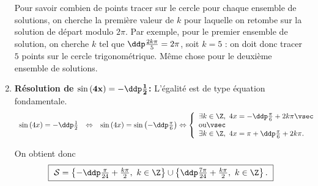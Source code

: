\begin{correction}
\begin{enumerate}
Pour savoir combien de points tracer sur le cercle pour chaque ensemble de solutions, on cherche la premi\`ere valeur de $k$ pour laquelle on retombe sur la solution de d\'epart modulo $2\pi$. Par exemple, pour le premier ensemble de solution, on cherche $k$ tel que $\ddp \frac{2k\pi}{5} = 2\pi$, soit $k=5$ : on doit donc tracer $5$ points sur le cercle trigonom\'etrique. M\^eme chose pour le deuxi\`eme ensemble de solutions.
\item  \textbf{R\'esolution de $\mathbf{\sin{(4x)}=-\ddp\frac{1}{2}}$:}
L'\'egalit\'e est de type \'equation fondamentale.
$$\begin{array}{lll}
\sin{(4x)}=-\ddp\frac{1}{2}&\Leftrightarrow &\sin{(4x)}= \sin{\left(-\ddp\frac{\pi}{6}\right)}
\Leftrightarrow  \left\lbrace\begin{array}{l}
\exists k\in\Z,\ 4x=-\ddp\frac{\pi}{6}+2k\pi\vsec\\
\hbox{ou}\vsec\\
\exists k\in\Z,\ 4x=\pi+\ddp\frac{\pi}{6}+2k\pi.
\end{array}\right.
\end{array}$$
\begin{minipage}[c]{0.45\linewidth}
On obtient donc
\begin{equation*}
\fbox{
$\mathcal{S}=\left\lbrace -\ddp\frac{\pi}{24}+\frac{k\pi}{2},\ k\in\Z\right\rbrace\cup\left\lbrace \ddp\frac{7\pi}{24}+\frac{k\pi}{2},\ k\in\Z\right\rbrace.$
}
\end{equation*}
\end{minipage}
\quad

\begin{center}
\end{center}


\end{enumerate}
\end{correction}
